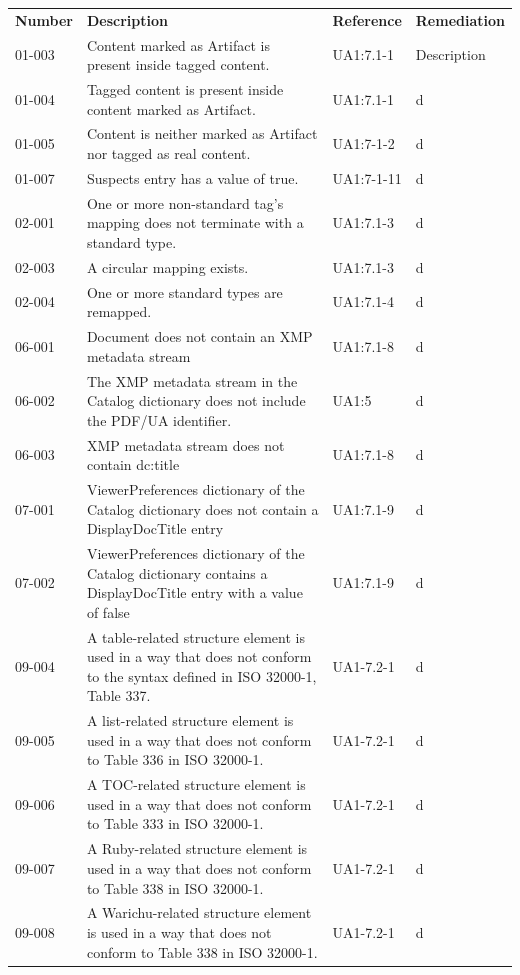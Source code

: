 \documentclass{book}
\begin{document}
\noindent\begin{tabular}{lp{5cm}lp{5cm}}
  \textbf{Number} & \textbf{Description} & \textbf{Reference} & \textbf{Remediation}\\
  01-003 & Content marked as Artifact is present inside tagged content. & UA1:7.1-1 & Description\\
  01-004 & Tagged content is present inside content marked as Artifact. & UA1:7.1-1 & d\\
  01-005 & Content is neither marked as Artifact nor tagged as real content. & UA1:7-1-2 & d\\
  01-007 & Suspects entry has a value of true. & UA1:7-1-11 & d\\
  02-001 & One or more non-standard tag’s mapping does not terminate with a standard type. & UA1:7.1-3 & d\\
  02-003 & A circular mapping exists. & UA1:7.1-3 & d\\
  02-004 & One or more standard types are remapped. & UA1:7.1-4 & d\\
  06-001 & Document does not contain an XMP metadata stream & UA1:7.1-8 & d\\
  06-002 & The XMP metadata stream in the Catalog dictionary does not include the PDF/UA identifier. & UA1:5 & d\\
  06-003 & XMP metadata stream does not contain dc:title & UA1:7.1-8 & d\\
  07-001 & ViewerPreferences dictionary of the Catalog dictionary does not contain a DisplayDocTitle entry & UA1:7.1-9 & d\\
  07-002 & ViewerPreferences dictionary of the Catalog dictionary contains a DisplayDocTitle entry with a value of false & UA1:7.1-9 & d\\
  09-004 & A table-related structure element is used in a way that does not conform to the syntax defined in ISO 32000-1, Table 337. & UA1-7.2-1 & d\\
  09-005 & A list-related structure element is used in a way that does not conform to Table 336 in ISO 32000-1. & UA1-7.2-1 & d\\
  09-006 & A TOC-related structure element is used in a way that does not conform to Table 333 in ISO 32000-1. & UA1-7.2-1 & d\\
  09-007 & A Ruby-related structure element is used in a way that does not conform to Table 338 in ISO 32000-1. & UA1-7.2-1 & d\\
  09-008 & A Warichu-related structure element is used in a way that does not conform to Table 338 in ISO 32000-1. & UA1-7.2-1 & d\\

\end{tabular}
\end{document}
